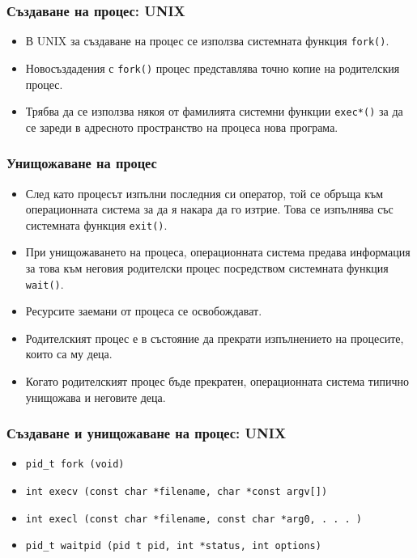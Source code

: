 \documentclass[ignorenonframetext, hyperref=unicode]{beamer}
\begin{document}
\begin{frame}\frametitle{Създаване на процес: UNIX}
\begin{itemize}
\item В UNIX за създаване на процес се използва системната функция
\lstinline{fork()}.
\item Новосъздадения с \lstinline{fork()} процес представлява точно копие на
родителския процес.
\item Трябва да се използва някоя от фамилията системни функции
\lstinline{exec*()} за да се зареди в адресното пространство на процеса нова
програма.
\end{itemize}
\end{frame}


\begin{frame}\frametitle{Унищожаване на процес}
\begin{itemize}
\item След като процесът изпълни последния си оператор, той се обръща към
операционната система за да я накара да го изтрие. Това се изпълнява със
системната функция \lstinline{exit()}.
\item При унищожаването на процеса, операционната система предава информация за
това към неговия родителски процес посредством системната функция
\lstinline{wait()}.
\item Ресурсите заемани от процеса се освобождават.
\item Родителският процес е в състояние да прекрати изпълнението на процесите,
които са му деца.
\item Когато родителският процес бъде прекратен, операционната система типично
унищожава и неговите деца.
\end{itemize}
\end{frame}

\begin{frame}\frametitle{Създаване и унищожаване на процес: UNIX}
\begin{itemize}
\item 
\lstinline{pid_t fork (void)}
\item 
\lstinline{int execv (const char *filename, char *const argv[])}
\item 
\lstinline{int execl (const char *filename, const char *arg0, . . . )}
\item
\lstinline{pid_t waitpid (pid t pid, int *status, int options)}
\end{itemize}
\end{frame}
\end{document}
